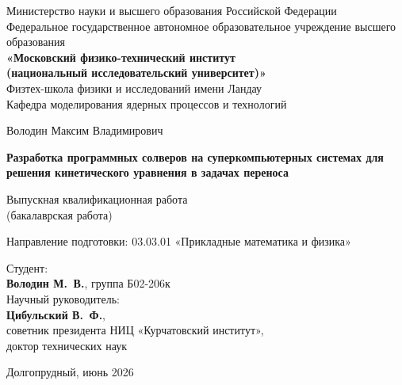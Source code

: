 \begin{titlepage}
\thispagestyle{empty}
\centering
{\normalsize
Министерство науки и высшего образования Российской Федерации \\[2pt]
Федеральное государственное автономное образовательное учреждение высшего образования \\[2pt]
\textbf{«Московский физико-технический институт \\(национальный исследовательский университет)»} \\[6pt]
Физтех-школа физики и исследований имени Ландау \\
Кафедра моделирования ядерных процессов и технологий \\}

\vfill
{\large Володин Максим Владимирович\par}
\vspace{10mm}
{\Large\bfseries Разработка программных солверов на суперкомпьютерных системах для решения кинетического уравнения в
задачах переноса \par}
\vspace{6mm}
{\normalsize Выпускная квалификационная работа \\(бакалаврская работа) \par}
{\normalsize Направление подготовки: 03.03.01 «Прикладные математика и физика» \par}
\vfill

\raggedright
\hspace{60mm}\begin{minipage}{0.5\textwidth}
Студент:\\
\textbf{Володин М.\, В.}, группа Б02-206к\\[10pt]
Научный руководитель:\\
\textbf{Цибульский В.\, Ф.},\\
советник президента НИЦ «Курчатовский институт»,\\
доктор технических наук
\end{minipage}

\vfill
\centering
{\normalsize Долгопрудный, июнь 2026 \par}
\end{titlepage}

